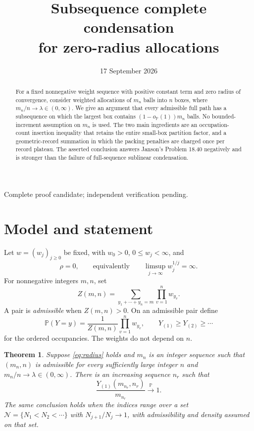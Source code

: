 \documentclass[11pt]{article}
\title{Subsequence complete condensation\protect\\for zero-radius allocations}
\author{}
\date{17 September 2026}
\newtheorem{theorem}{Theorem}
\theoremstyle{remark}\newtheorem{remark}[theorem]{Remark}
\newcommand{\Pp}{\mathbb P}
\begin{document}
\maketitle
\vspace{-1.5em}
\begin{center}\small Complete proof candidate; independent verification pending.\end{center}
\begin{abstract}
For a fixed nonnegative weight sequence with positive constant term and zero
radius of convergence, consider weighted allocations of $m_n$ balls into $n$
boxes, where $m_n/n\to\lambda\in(0,\infty)$. We give an argument that every
admissible full path has a subsequence on which the largest box contains
$(1-o_{\Pp}(1))m_n$ balls. No bounded-increment assumption on $m_n$ is used.
The two main ingredients are an occupation-count insertion inequality that
retains the entire small-box partition factor, and a geometric-record
summation in which the packing penalties are charged once per record
plateau. The asserted conclusion answers Janson's Problem 18.40 negatively
and is stronger than the failure of full-sequence sublinear condensation.
\end{abstract}

\section{Model and statement}
Let $w=(w_j)_{j\ge0}$ be fixed, with $w_0>0$, $0\le w_j<\infty$, and
\begin{equation}\label{eq:radius}
 \rho=0,\qquad\text{equivalently}\qquad
 \limsup_{j\to\infty}w_j^{1/j}=\infty.
\end{equation}
For nonnegative integers $m,n$, set
\[
 Z(m,n)=\sum_{y_1+\cdots+y_n=m}\prod_{v=1}^n w_{y_v}.
\]
A pair is \emph{admissible} when $Z(m,n)>0$. On an admissible pair define
\[
 \Pp(Y=y)=\frac{1}{Z(m,n)}\prod_{v=1}^n w_{y_v},
 \qquad Y_{(1)}\ge Y_{(2)}\ge\cdots
\]
for the ordered occupancies. The weights do not depend on $n$.

\begin{theorem}\label{thm:main}
Suppose \eqref{eq:radius} holds and $m_n$ is an integer sequence such that
$(m_n,n)$ is admissible for every sufficiently large integer $n$ and
$m_n/n\to\lambda\in(0,\infty)$. There is an increasing sequence $n_r$ such that
\begin{equation}\label{eq:conclusion}
 \frac{Y_{(1)}(m_{n_r},n_r)}{m_{n_r}}
 \xrightarrow{\Pp}1.
\end{equation}
The same conclusion holds when the indices range over a set
$\mathcal N=\{N_1<N_2<\cdots\}$ with $N_{j+1}/N_j\to1$, with admissibility
and density assumed on that set.
\end{theorem}
\end{document}

